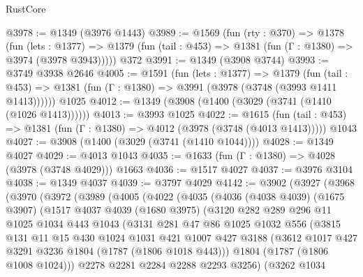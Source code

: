 \begin{lexlean}{RustCore}
\begin{coremodule}
@3978 := @1349 (@3976 @1443)
@3989 := @1569
    (fun (rty : @370) =>
    @1378
      (fun (lets : @1377) =>
      @1379 (fun (tail : @453) => @1381 (fun (Γ : @1380) => @3974 (@3978 @3943)))))
    @372
@3991 := @1349 (@3908 @3744)
@3993 := @3749 @3938 @2646
@4005 := @1591
    (fun (lets : @1377) =>
    @1379
      (fun (tail : @453) => @1381 (fun (Γ : @1380) => @3991 (@3978 (@3748 (@3993 @1411 @1413))))))
    @1025
@4012 := @1349 (@3908 (@1400 (@3029 (@3741 (@1410 (@1026 @1413))))))
@4013 := @3993 @1025
@4022 := @1615
    (fun (tail : @453) => @1381 (fun (Γ : @1380) => @4012 (@3978 (@3748 (@4013 @1413)))))
    @1043
@4027 := @3908 (@1400 (@3029 (@3741 (@1410 @1044))))
@4028 := @1349 @4027
@4029 := @4013 @1043
@4035 := @1633 (fun (Γ : @1380) => @4028 (@3978 (@3748 @4029))) @1663
@4036 := @1517 @4027
@4037 := @3976 @3104
@4038 := @1349 @4037
@4039 := @3797 @4029
@4142 := @3902
    (@3927
      (@3968
        (@3970
          (@3972
            (@3989
              (@4005
                (@4022
                  (@4035
                    (@4036
                      (@4038 @4039)
                      (@1675 @3907)
                      (@1517
                        @4037
                        @4039
                        (@1680 @3975)
                        (@3120
                          @282
                          @289
                          @296
                          @11
                          @1025
                          @1034
                          @443
                          @1043
                          (@3131
                            @281
                            @47
                            @86
                            @1025
                            @1032
                            @556
                            (@3815
                              @131
                              @11
                              @15
                              @430
                              @1024
                              @1031
                              @421
                              @1007
                              @427
                              @3188
                              (@3612 @1017 @427 @3291 @3236 @1804 (@1787 (@1806 @1018 @443)))
                              @1804
                              (@1787 (@1806 @1008 @1024)))
                            @2278
                            @2281
                            @2284
                            @2288
                            @2293
                            @3256)
                          (@3262
                            @1034

\end{coremodule}
\end{lexlean}
